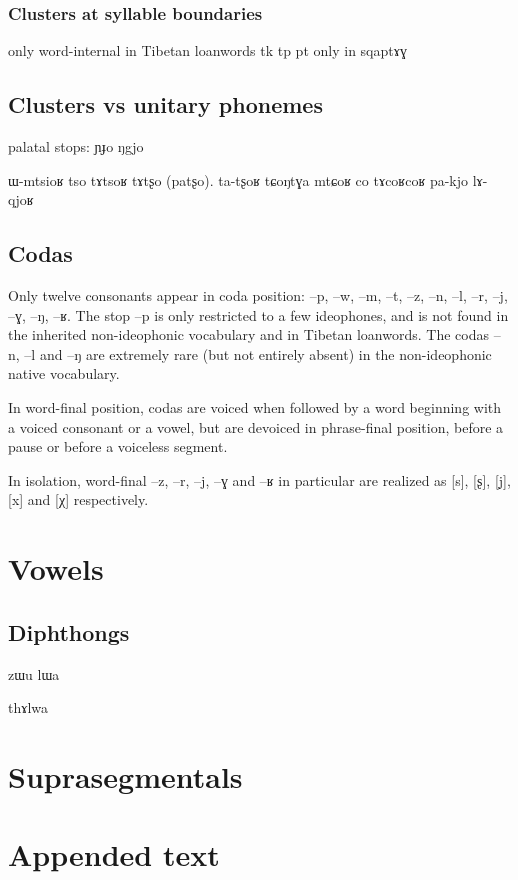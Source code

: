 \documentclass[oldfontcommands,oneside,a4paper,11pt]{article}
\newcommand{\ipa}[1]{{\phon #1}} %
\begin{document}
 
 
 \subsubsection{Clusters at syllable boundaries}
 only word-internal in Tibetan loanwords tk tp 
 pt only in \ipa{sqaptɤɣ}
 
 
      \subsection{Clusters vs unitary phonemes} \label{sec:non.clusters}
      
      
palatal stops:      
      \ipa{ɲɟo} \ipa{ŋgjo}
      
      ɯ-mtsioʁ
	tso tɤtsoʁ 
	tɤtʂo (patʂo). ta-tʂoʁ
 tɕoŋtɣa mtɕoʁ
 co tɤcoʁcoʁ
 pa-kjo
     lɤ-qjoʁ
      \subsection{Codas} \label{sec:coda}
    Only twelve   consonants appear in coda position:  \ipa{--p}, \ipa{--w}, \ipa{--m}, \ipa{--t}, \ipa{--z}, \ipa{--n}, \ipa{--l}, \ipa{--r}, \ipa{--j}, \ipa{--ɣ}, \ipa{--ŋ}, \ipa{--ʁ}. The stop \ipa{--p} is only restricted to a few ideophones, and is not found in the inherited non-ideophonic vocabulary and in Tibetan loanwords. The codas \ipa{--n}, \ipa{--l} and \ipa{--ŋ} are extremely rare (but not entirely absent) in the non-ideophonic native vocabulary. 
    
In word-final position, codas are voiced when followed by a word beginning with a voiced consonant or a vowel, but are devoiced in phrase-final position, before a pause or before a voiceless segment.

In isolation, word-final \ipa{--z}, \ipa{--r}, \ipa{--j}, \ipa{--ɣ} and \ipa{--ʁ} in particular are realized as [s], [ʂ], [j̣], [x] and [χ] respectively.
    
    
     \section{Vowels} \label{sec:vowels}
     
          \subsection{Diphthongs}
     zɯu
     lɯa
     
     thɤlwa
     
     \section{Suprasegmentals}
     
         
     \section{Appended text}


\end{document}

